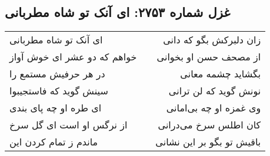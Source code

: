 \begin{center}
\section*{غزل شماره ۲۷۵۳: ای آنک تو شاه مطربانی}
\label{sec:2753}
\begin{longtable}{l p{0.5cm} r}
ای آنک تو شاه مطربانی
&&
زان دلبرکش بگو که دانی
\\
خواهم که دو عشر ای خوش آواز
&&
از مصحف حسن او بخوانی
\\
در هر حرفیش مستمع را
&&
بگشاید چشمه معانی
\\
سینش گوید که فاستجیبوا
&&
نونش گوید که لن ترانی
\\
ای طره او چه پای بندی
&&
وی غمزه او چه بی‌امانی
\\
از نرگس او است ای گل سرخ
&&
کان اطلس سرخ می‌درانی
\\
ماندم ز تمام کردن این
&&
باقیش تو بگو بر این نشانی
\\
\end{longtable}
\end{center}
